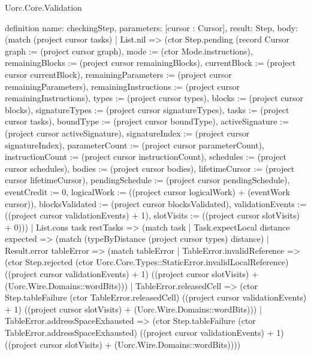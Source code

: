 \begin{lexlean}{Uorc.Core.Validation}
\begin{semanticmodule}
definition{
  name: checkingStep,
  parameters: [cursor : Cursor],
  result: Step,
  body: (match (project cursor tasks)
    | List.nil => (ctor Step.pending (record Cursor {graph := (project cursor graph), mode := (ctor Mode.instructions), remainingBlocks := (project cursor remainingBlocks), currentBlock := (project cursor currentBlock), remainingParameters := (project cursor remainingParameters), remainingInstructions := (project cursor remainingInstructions), types := (project cursor types), blocks := (project cursor blocks), signatureTypes := (project cursor signatureTypes), tasks := (project cursor tasks), boundType := (project cursor boundType), activeSignature := (project cursor activeSignature), signatureIndex := (project cursor signatureIndex), parameterCount := (project cursor parameterCount), instructionCount := (project cursor instructionCount), schedules := (project cursor schedules), bodies := (project cursor bodies), lifetimeCursor := (project cursor lifetimeCursor), pendingSchedule := (project cursor pendingSchedule), eventCredit := 0, logicalWork := ((project cursor logicalWork) + (eventWork cursor)), blocksValidated := (project cursor blocksValidated), validationEvents := ((project cursor validationEvents) + 1), slotVisits := ((project cursor slotVisits) + 0)}))
    | List.cons task restTasks => (match task
      | Task.expectLocal distance expected => (match (typeByDistance (project cursor types) distance)
        | Result.error tableError => (match tableError
          | TableError.invalidReference => (ctor Step.rejected (ctor Uorc.Core.Types::StaticError.invalidLocalReference) ((project cursor validationEvents) + 1) ((project cursor slotVisits) + (Uorc.Wire.Domains::wordBits)))
          | TableError.releasedCell => (ctor Step.tableFailure (ctor TableError.releasedCell) ((project cursor validationEvents) + 1) ((project cursor slotVisits) + (Uorc.Wire.Domains::wordBits)))
          | TableError.addressSpaceExhausted => (ctor Step.tableFailure (ctor TableError.addressSpaceExhausted) ((project cursor validationEvents) + 1) ((project cursor slotVisits) + (Uorc.Wire.Domains::wordBits))))
}
\end{semanticmodule}
\end{lexlean}
